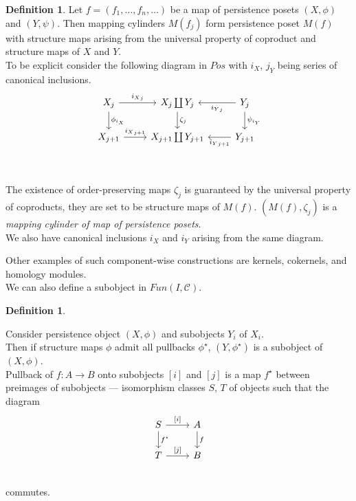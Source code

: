 \documentclass[english,12pt]{article}
\newcounter{stmcounter}[section]
\numberwithin{equation}{section}
\theoremstyle{definition}
\newtheorem{definition}[stmcounter]{Definition}
\theoremstyle{remark}
\newcommand{\define}[1]{{\textit{#1}}}
\begin{document}
\begin{definition}
  Let $f = (f_1,\ldots,f_n,\ldots)$ be a map of persistence posets $(X, \phi)$ and $(Y, \psi)$. Then mapping cylinders $M(f_j)$ form persistence poset $M(f)$ with structure maps arising from the universal property of coproduct and structure maps of $X$ and $Y$.\\

  To be explicit consider the following diagram in $Pos$ with $i_X$, $j_Y$ being series of canonical inclusions.\\
  \begin{equation}
  \begin{tikzcd}
  X_{j}\arrow{r}{{i_X}_j}\arrow{d}{\phi_{i_X}} & X_j \coprod Y_j\arrow{d}{\zeta_j} & Y_{j}\arrow{l}{{i_Y}_j}\arrow{d}{\psi_{i_Y}} \\
  X_{j+1}\arrow{r}{{i_X}_{j+1}} & X_{j+1} \coprod Y_{j+1} & Y_{j+1}\arrow{l}{{i_Y}_{j+1}} \\
  \end{tikzcd}
  \end{equation}\\

  The existence of order-preserving maps $\zeta_j$ is guaranteed by the universal property of coproducts, they are set to be structure maps of $M(f)$. $(M(f), \zeta_j)$ is a \define{mapping cylinder of map of persistence posets}.\\

  We also have canonical inclusions $i_X$ and $i_Y$ arising from the same diagram.
\end{definition}

Other examples of such component-wise constructions are kernels, cokernels, and homology modules.\\

We can also define a subobject in $Fun(I, \mathcal{C})$.

\begin{definition} ~ \par
  Consider persistence object $(X,\phi)$ and subobjects $Y_i$ of $X_i$.\\

  Then if structure maps $\phi$ admit all pullbacks $\phi^{\star}$, $(Y,\phi^{\star})$ is a subobject of $(X, \phi)$.\\

  Pullback of $f : A \to B$ onto subobjects $[i]$ and $[j]$ is a map $f^{\star}$ between preimages of subobjects --- isomorphism classes $S$, $T$ of objects such that the diagram\\
  \begin{equation}
  \begin{tikzcd}
    S \arrow{d}{f^{\star}}\arrow{r}{[i]} & A\arrow{d}{f} \\
    T \arrow{r}{[j]} & B \\
  \end{tikzcd}
  \end{equation}
  commutes.
\end{definition}
\end{document}

